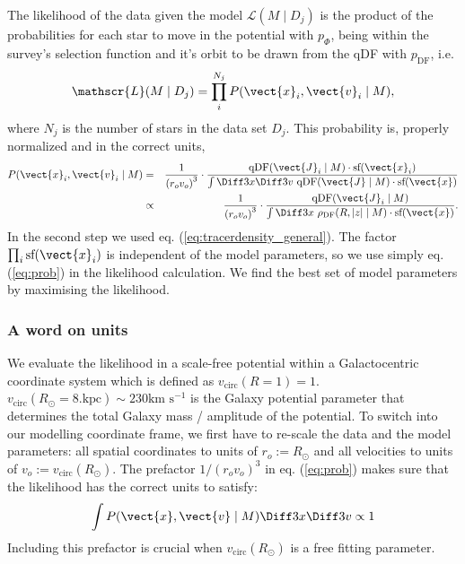 The likelihood of the data given the model $\mathscr{L}(M \mid D_j)$ is the product of the probabilities for each star to move in the potential with $p_\Phi$, being within the survey's selection function and it's orbit to be drawn from the qDF with $p_\text{DF}$, i.e. 
\begin{equation}
\mathscr{L}(M \mid D_j) = \prod_i^{N_j} P(\vect{x}_i,\vect{v}_i \mid M), \label{eq:likelihood}
\end{equation}
where $N_j$ is the number of stars in the data set $D_j$. This probability is, properly normalized and in the correct units,
\begin{eqnarray}
P(\vect{x}_i,\vect{v}_i \mid M) &=& \frac{1}{\left(r_o v_o\right)^3} \cdot \frac{\text{qDF}(\vect{J}_i \mid M) \cdot \text{sf}(\vect{x}_i)}{\int \Diff 3 x \Diff 3 v \  \text{qDF}(\vect{J} \mid M) \cdot \text{sf}(\vect{x})}\nonumber\\
&\propto& \frac{1}{\left(r_o v_o\right)^3} \cdot \frac{\text{qDF}(\vect{J}_i \mid M)}{\int \Diff 3 x \  \rho_\text{DF}(R,|z| \mid M) \cdot \text{sf}(\vect{x})}. \label{eq:prob}
\end{eqnarray}
In the second step we used eq. (\ref{eq:tracerdensity_general}). The factor $\prod_i\text{sf}(\vect{x}_i)$ is independent of the model parameters, so we use simply eq. (\ref{eq:prob}) in the likelihood calculation. We find the best set of model parameters by maximising the likelihood. 


\subsubsection{A word on units}

We evaluate the likelihood in a scale-free potential within a Galactocentric coordinate system which is defined as $v_\text{circ}(R = 1) = 1$. $v_\text{circ}(R_\odot = 8. \text{kpc}) \sim 230 \text{km s$^{-1}$}$ is the Galaxy potential parameter that determines the total Galaxy mass / amplitude of the potential. To switch into our modelling coordinate frame, we first have to re-scale the data and the model parameters: all spatial coordinates to units of $r_o := R_\odot$ and all velocities to units of $v_o := v_\text{circ}(R_\odot )$. The prefactor $1/\left(r_o v_o\right)^3$ in eq. (\ref{eq:prob}) makes sure that the likelihood has the correct units to satisfy:
\begin{eqnarray*}
\int P(\vect{x},\vect{v} \mid M) \Diff 3 x \Diff 3 v \propto 1
\end{eqnarray*} 
Including this prefactor is crucial when $v_\text{circ}(R_\odot )$ is a free fitting parameter.

